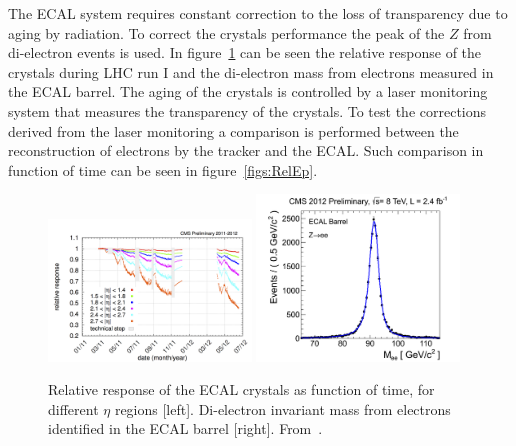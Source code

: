 The ECAL system requires constant correction to the loss of transparency due to aging by radiation. To correct the crystals performance the peak of the $Z$ from di-electron events is used. In figure~\ref{fig:RelaResp} can be seen the relative response of the crystals during LHC run I and the di-electron mass from electrons measured in the ECAL barrel. The aging of the crystals is controlled by a laser monitoring system that measures the transparency of the crystals. To test the corrections derived from the laser monitoring a comparison is performed between the reconstruction of electrons by the tracker and the ECAL. Such comparison in function of time can be seen in figure~\ref{figs:RelEp}.

\begin{figure}[!Hhtbp]
  \begin{center}
    \includegraphics[width=0.48\textwidth]{figs/laser_monitoring_histories_2011-2012.png}
    \includegraphics[width=0.48\textwidth]{figs/_500___2012_zee_eb_golden.png}
    \caption{Relative response of the ECAL crystals as function of time, for different $\eta$ regions [left]. Di-electron invariant mass from electrons identified in the ECAL barrel [right]. From~\cite{CMS-DP-2012-015}.}
    \label{fig:RelaResp}
  \end{center}
\end{figure}

